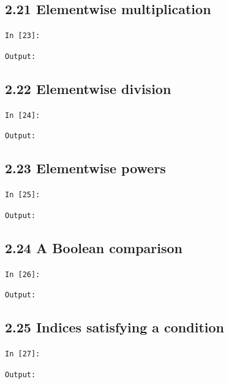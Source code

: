 \documentclass[11pt]{article}
\begin{document}
\par\medskip\noindent\begin{minipage}{\linewidth}
\subsection*{2.21 Elementwise multiplication}
\noindent\texttt{In [23]:}

\noindent\texttt{Output:}

\end{minipage}\par

\par\medskip\noindent\begin{minipage}{\linewidth}
\subsection*{2.22 Elementwise division}
\noindent\texttt{In [24]:}

\noindent\texttt{Output:}

\end{minipage}\par

\par\medskip\noindent\begin{minipage}{\linewidth}
\subsection*{2.23 Elementwise powers}
\noindent\texttt{In [25]:}

\noindent\texttt{Output:}

\end{minipage}\par

\par\medskip\noindent\begin{minipage}{\linewidth}
\subsection*{2.24 A Boolean comparison}
\noindent\texttt{In [26]:}

\noindent\texttt{Output:}

\end{minipage}\par

\par\medskip\noindent\begin{minipage}{\linewidth}
\subsection*{2.25 Indices satisfying a condition}
\noindent\texttt{In [27]:}

\noindent\texttt{Output:}

\end{minipage}\par
\end{document}
